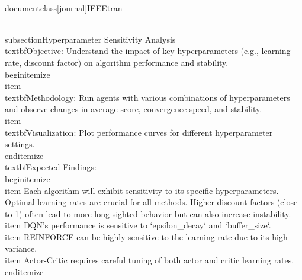 \\documentclass[journal]{IEEEtran}
\begin{document}
\\subsection{Hyperparameter Sensitivity Analysis}
\\textbf{Objective}: Understand the impact of key hyperparameters (e.g., learning rate, discount factor) on algorithm performance and stability.
\\begin{itemize}
    \\item \\textbf{Methodology}: Run agents with various combinations of hyperparameters and observe changes in average score, convergence speed, and stability.
    \\item \\textbf{Visualization}: Plot performance curves for different hyperparameter settings.
\\end{itemize}
\\textbf{Expected Findings}:
\\begin{itemize}
    \\item Each algorithm will exhibit sensitivity to its specific hyperparameters. Optimal learning rates are crucial for all methods. Higher discount factors (close to 1) often lead to more long-sighted behavior but can also increase instability.
    \\item DQN's performance is sensitive to `epsilon_decay` and `buffer_size`.
    \\item REINFORCE can be highly sensitive to the learning rate due to its high variance.
    \\item Actor-Critic requires careful tuning of both actor and critic learning rates.
\\end{itemize}
\end{document}
